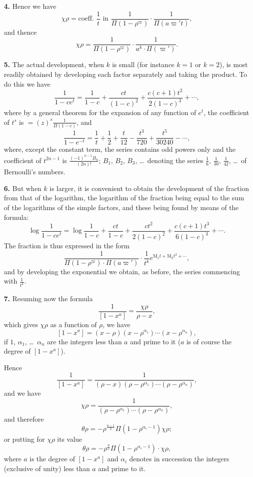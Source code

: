 \documentclass[12pt,a4paper]{article}
\theoremstyle{definition}
\begin{document}
\medskip
\noindent\textbf{4.} Hence we have
\[\chi \rho = \text{coeff. } \frac{1}{t} \text{ in } \frac{1}{\Pi(1-\rho^{\varpi})} \cdot \frac{1}{\Pi(a\varpi' t)},\]
and thence
\[\chi \rho = \frac{1}{\Pi(1-\rho^{\varpi})} \cdot \frac{1}{a^k \cdot \Pi(\varpi')}.\]

\medskip
\noindent\textbf{5.} The actual development, when $k$ is small (for instance $k=1$ or $k=2$), is most readily obtained by developing each factor separately and taking the product. To do this we have
\[\frac{1}{1-ce^t} = \frac{1}{1-c} + \frac{ct}{(1-c)^2} + \frac{c(c+1)t^2}{2(1-c)^3} + \cdots,\]
where by a general theorem for the expansion of any function of $e^t$, the coefficient of $t^s$ is $=(z)^s \frac{1}{\Pi(1-c)}$, and
\[\frac{1}{1-e^{-t}} = \frac{1}{t} + \frac{1}{2} + \frac{t}{12} - \frac{t^3}{720} + \frac{t^5}{30240} - \cdots,\]
where, except the constant term, the series contains odd powers only and the coefficient of $t^{2n-1}$ is $\frac{(-1)^{n-1}B_n}{(2n)!}$; $B_1$, $B_2$, $B_3$, \ldots\ denoting the series $\frac{1}{6}$, $\frac{1}{30}$, $\frac{1}{42}$, \ldots\ of Bernoulli's numbers.

\medskip
\noindent\textbf{6.} But when $k$ is larger, it is convenient to obtain the development of the fraction from that of the logarithm, the logarithm of the fraction being equal to the sum of the logarithms of the simple factors, and these being found by means of the formula:
\[\log \frac{1}{1-ce^t} = \log \frac{1}{1-c} + \frac{ct}{1-c} + \frac{ct^2}{2(1-c)^2} + \frac{c(c+1)t^3}{6(1-c)^3} + \cdots.\]
The fraction is thus expressed in the form
\[\frac{1}{\Pi(1-\rho^{\varpi}) \cdot \Pi(a\varpi')} \cdot \frac{1}{t^k} e^{\mathrm{M}_1 t + \mathrm{M}_2 t^2 + \cdots},\]
and by developing the exponential we obtain, as before, the series commencing with $\frac{1}{t^k}$.

\newpage

\medskip
\noindent\textbf{7.} Resuming now the formula
\[\frac{1}{[1-x^a]} = \frac{\chi \rho}{\rho - x},\]
which gives $\chi \rho$ as a function of $\rho$, we have
\[[1-x^a] = (x-\rho)(x-\rho^{\alpha_1})\cdots(x-\rho^{\alpha_n}),\]
if $1$, $\alpha_1$, \ldots\ $\alpha_n$ are the integers less than $a$ and prime to it ($a$ is of course the degree of $[1-x^a]$).

Hence
\[\frac{1}{[1-x^a]} = \frac{1}{(\rho-x)(\rho-\rho^{\alpha_1})\cdots(\rho-\rho^{\alpha_n})},\]
and we have
\[\chi \rho = \frac{1}{(\rho-\rho^{\alpha_1})\cdots(\rho-\rho^{\alpha_n})},\]
and therefore
\[\theta \rho = -\rho^{\frac{a-1}{2}} \Pi(1-\rho^{\alpha_i-1}) \chi \rho;\]
or putting for $\chi \rho$ its value
\[\theta \rho = -\rho^{\frac{a}{2}} \Pi(1-\rho^{\alpha_i-1}) \cdot \chi \rho,\]
where $a$ is the degree of $[1-x^a]$ and $\alpha_i$ denotes in succession the integers (exclusive of unity) less than $a$ and prime to it.
\end{document}

